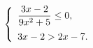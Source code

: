 \begin{ex}[type=ineq_system]
	\begin{condition}
		\( \left\{
		\begin{array}{l}
			\dfrac{3x-2}{9x^2+5}\le0,\vspace{2mm}\\
			3x-2>2x-7.
		\end{array}
		\right. \)
	\end{condition}
\end{ex}